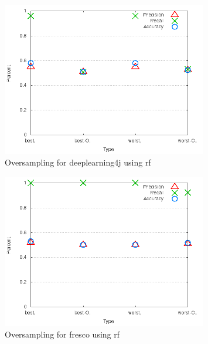 \begin{figure}[!t]
\centering
\includegraphics[width=0.8\textwidth]{images/rf/test_4/deeplearning4j_sample_range.png}
\caption{Oversampling for deeplearning4j using \gls{rf}}
\label{fig:test_4_deeplearning4j_rf}
\end{figure}

\begin{figure}[!t]
\centering
\includegraphics[width=0.8\textwidth]{images/rf/test_4/fresco_sample_range.png}
\caption{Oversampling for fresco using \gls{rf}}
\label{fig:test_4_fresco_rf}
\end{figure}

